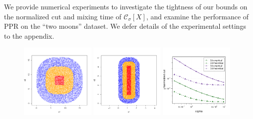 \documentclass[11pt,twoside]{article}
\newcommand{\1}{\mathbf{1}}
\newcommand{\Xbf}{X}             %
\newcommand{\Cset}{\mathcal{C}}
\newcommand{\Csig}{\Cset_{\sigma}}
\begin{document}
We provide numerical experiments to investigate the tightness of our bounds on
the normalized cut and mixing time of $\Csig[\Xbf]$, and examine the performance
of PPR on the ``two moons'' dataset. We defer details of the experimental
settings to the appendix.   

\begin{figure}[tb]
  \centering
  \includegraphics[width=0.32\textwidth]{example1plots/sample2}
  \includegraphics[width=0.32\textwidth]{example1plots/sample1}
  \includegraphics[width=0.32\textwidth]{example1plots/sigma_normalized_cut_plot}
  

\end{figure}
\end{document}
